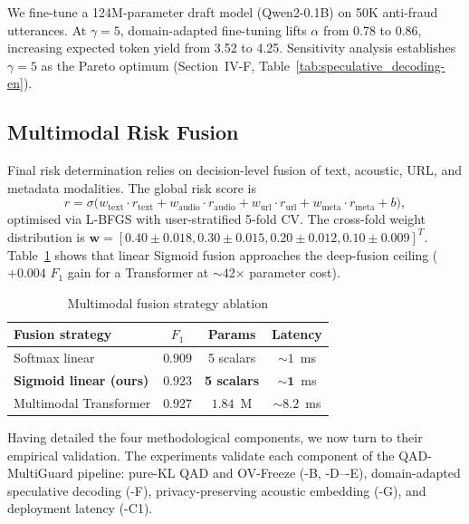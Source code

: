 \documentclass[lettersize,journal]{IEEEtran}
\begin{document}
We fine-tune a 124M-parameter draft model (Qwen2-0.1B) on 50K anti-fraud utterances. At $\gamma = 5$, domain-adapted fine-tuning lifts $\alpha$ from 0.78 to 0.86, increasing expected token yield from 3.52 to 4.25. Sensitivity analysis establishes $\gamma = 5$ as the Pareto optimum (Section~IV-F, Table~\ref{tab:speculative_decoding-en}).

\subsection{Multimodal Risk Fusion}

Final risk determination relies on decision-level fusion of text, acoustic, URL, and metadata modalities. The global risk score is
\begin{equation}
\label{eq:fusion}
r = \sigma\bigl(w_{\mathrm{text}}\cdot r_{\mathrm{text}}
+ w_{\mathrm{audio}}\cdot r_{\mathrm{audio}} + w_{\mathrm{url}}\cdot r_{\mathrm{url}} + w_{\mathrm{meta}}\cdot r_{\mathrm{meta}} + b\bigr),
\end{equation}
optimised via L-BFGS with user-stratified 5-fold CV. The cross-fold weight distribution is $\mathbf{w} = [0.40 \pm 0.018, 0.30 \pm 0.015, 0.20 \pm 0.012, 0.10 \pm 0.009]^T$. Table~\ref{tab:fusion_ablation-en} shows that linear Sigmoid fusion approaches the deep-fusion ceiling ($+0.004$ $F_1$ gain for a Transformer at $\sim$42$\times$ parameter cost).

\begin{table}[!t]
\centering
\caption{Multimodal fusion strategy ablation}
\label{tab:fusion_ablation-en}
\small
\renewcommand{\arraystretch}{1.15}
\begin{tabular}{lccc}
\toprule
\textbf{Fusion strategy} & \textbf{$F_1$} & \textbf{Params} & \textbf{Latency} \\
\midrule
Softmax linear & $0.909$ & 5 scalars & $\sim 1$~ms \\
\textbf{Sigmoid linear (ours)} & $\mathbf{0.923}$ & \textbf{5 scalars} & $\mathbf{\sim 1}$~ms \\
Multimodal Transformer & $0.927$ & $1.84$~M & $\sim 8.2$~ms \\
\bottomrule
\end{tabular}
\end{table}

Having detailed the four methodological components, we now turn to their empirical validation. The experiments validate each component of the QAD-MultiGuard pipeline: pure-KL QAD and OV-Freeze (\SIV-B, \SIV-D--\SIV-E), domain-adapted speculative decoding (\SIV-F), privacy-preserving acoustic embedding (\SIV-G), and deployment latency (\SIII-C1).
\end{document}
